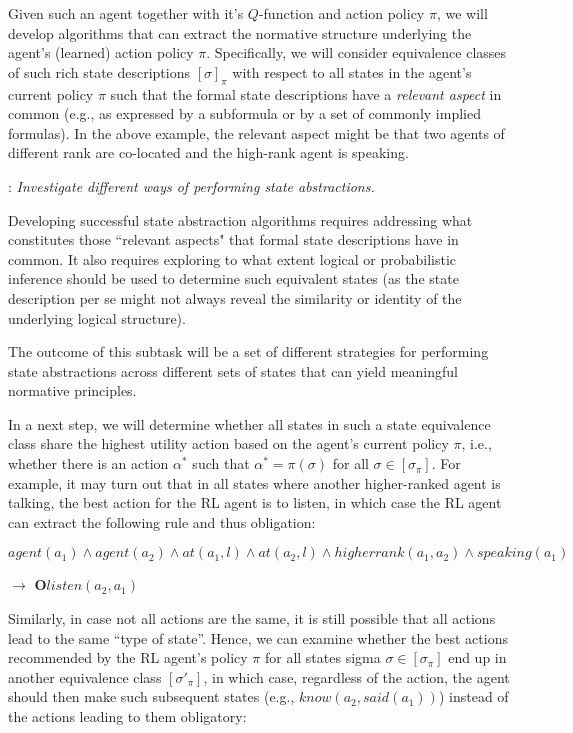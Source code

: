 \documentclass[12pt]{article}
\begin{document}
Given such an agent together with it's $Q$-function and action policy
$\pi$, we will develop algorithms that can extract the normative
structure underlying the agent's (learned) action policy $\pi$.
Specifically, we will consider equivalence classes of such rich state
descriptions $[\sigma]_\pi$ with respect to all states in the agent's
current policy $\pi$ such that the formal state descriptions have a {\em relevant aspect} in common (e.g., as expressed by a subformula or by a
set of commonly implied formulas).  In the above example, the relevant
aspect might be that two agents of different rank are co-located and
the high-rank agent is speaking.

\vskip 0.05in
: {\em Investigate different ways of performing
  state abstractions.}
  \vskip 0.05in
    
\noindent Developing successful state abstraction algorithms requires addressing  what constitutes those ``relevant aspects" that formal state descriptions have in common.  It also requires exploring to what extent
  logical or probabilistic inference should be used to determine such
  equivalent states (as the state description per se might not always
  reveal the similarity or identity of the underlying logical
  structure). 
  
  The outcome of this subtask will be a set of different
  strategies for performing state abstractions across different sets
  of states that can yield meaningful normative principles.  

In a next step, we will determine whether all states in such a state
equivalence class share the highest utility action based on the
agent's current policy $\pi$, i.e., whether there is an action
$\alpha^*$ such that $\alpha^* = \pi(\sigma)$ for all
$\sigma \in [\sigma_\pi]$.  For example, it may turn out that in all
states where another higher-ranked agent is talking, the best action
for the RL agent is to listen, in which case the RL agent can extract
the following rule and thus obligation:

\vskip 0.1in
\noindent $agent(a_1) \land agent(a_2) \land at(a_1,l) \land at(a_2,l) \land
higherrank(a_1,a_2) \land speaking(a_1)$ 

$\rightarrow$ {\bf
  O}$listen(a_2,a_1)$
\vskip 0.1in

Similarly, in case not all actions are the same, it is still possible
that all actions lead to the same ``type of state''.  Hence, we can
examine whether the best actions recommended by the RL agent's policy
$\pi$ for all states sigma $\sigma \in [\sigma_\pi]$ end up in another
equivalence class $[\sigma'_\pi]$, in which case, regardless of the
action, the agent should then make such subsequent states (e.g.,
$know(a_2,said(a_1))$) instead of the actions leading to them
obligatory:
\end{document}
